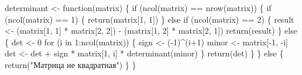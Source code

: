 \documentclass[
  letterpaper,
  DIV=11,
  numbers=noendperiod]{scrartcl}
\newenvironment{Shaded}{\begin{snugshade}}{\end{snugshade}}
\newcommand{\ControlFlowTok}[1]{\textcolor[rgb]{0.00,0.23,0.31}{#1}}
\newcommand{\DecValTok}[1]{\textcolor[rgb]{0.68,0.00,0.00}{#1}}
\newcommand{\FunctionTok}[1]{\textcolor[rgb]{0.28,0.35,0.67}{#1}}
\newcommand{\NormalTok}[1]{\textcolor[rgb]{0.00,0.23,0.31}{#1}}
\newcommand{\OtherTok}[1]{\textcolor[rgb]{0.00,0.23,0.31}{#1}}
\newcommand{\SpecialCharTok}[1]{\textcolor[rgb]{0.37,0.37,0.37}{#1}}
\newcommand{\StringTok}[1]{\textcolor[rgb]{0.13,0.47,0.30}{#1}}
\begin{document}
\begin{Shaded}
\begin{Highlighting}[]
\NormalTok{determinant }\OtherTok{\textless{}{-}} \ControlFlowTok{function}\NormalTok{(matrix) \{}
  \ControlFlowTok{if}\NormalTok{ (}\FunctionTok{ncol}\NormalTok{(matrix) }\SpecialCharTok{==} \FunctionTok{nrow}\NormalTok{(matrix)) \{}
    \ControlFlowTok{if}\NormalTok{ (}\FunctionTok{ncol}\NormalTok{(matrix) }\SpecialCharTok{==} \DecValTok{1}\NormalTok{) \{}
      \FunctionTok{return}\NormalTok{(matrix[}\DecValTok{1}\NormalTok{, }\DecValTok{1}\NormalTok{])}
\NormalTok{    \} }\ControlFlowTok{else} \ControlFlowTok{if}\NormalTok{ (}\FunctionTok{ncol}\NormalTok{(matrix) }\SpecialCharTok{==} \DecValTok{2}\NormalTok{) \{}
\NormalTok{      result }\OtherTok{\textless{}{-}}\NormalTok{ (matrix[}\DecValTok{1}\NormalTok{, }\DecValTok{1}\NormalTok{] }\SpecialCharTok{*}\NormalTok{ matrix[}\DecValTok{2}\NormalTok{, }\DecValTok{2}\NormalTok{]) }\SpecialCharTok{{-}}\NormalTok{ (matrix[}\DecValTok{1}\NormalTok{, }\DecValTok{2}\NormalTok{] }\SpecialCharTok{*}\NormalTok{ matrix[}\DecValTok{2}\NormalTok{, }\DecValTok{1}\NormalTok{])}
      \FunctionTok{return}\NormalTok{(result)}
\NormalTok{    \} }\ControlFlowTok{else}\NormalTok{ \{}
\NormalTok{      det }\OtherTok{\textless{}{-}} \DecValTok{0}
      \ControlFlowTok{for}\NormalTok{ (i }\ControlFlowTok{in} \DecValTok{1}\SpecialCharTok{:}\FunctionTok{ncol}\NormalTok{(matrix)) \{}
\NormalTok{        sign }\OtherTok{\textless{}{-}}\NormalTok{ (}\SpecialCharTok{{-}}\DecValTok{1}\NormalTok{)}\SpecialCharTok{\^{}}\NormalTok{(i}\SpecialCharTok{+}\DecValTok{1}\NormalTok{)}
\NormalTok{        minor }\OtherTok{\textless{}{-}}\NormalTok{ matrix[}\SpecialCharTok{{-}}\DecValTok{1}\NormalTok{, }\SpecialCharTok{{-}}\NormalTok{i]}
\NormalTok{        det }\OtherTok{\textless{}{-}}\NormalTok{ det }\SpecialCharTok{+}\NormalTok{ sign }\SpecialCharTok{*}\NormalTok{ matrix[}\DecValTok{1}\NormalTok{, i] }\SpecialCharTok{*} \FunctionTok{determinant}\NormalTok{(minor)}
\NormalTok{      \}}
      \FunctionTok{return}\NormalTok{(det)}
\NormalTok{    \}}
\NormalTok{  \} }\ControlFlowTok{else}\NormalTok{ \{}
    \FunctionTok{return}\NormalTok{(}\StringTok{"Матрица не квадратная"}\NormalTok{)}
\NormalTok{  \}}
\NormalTok{\}}
\end{Highlighting}
\end{Shaded}
\end{document}
